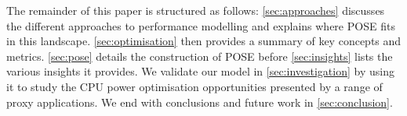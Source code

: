 The remainder of this paper is structured as follows: \autoref{sec:approaches} discusses the different approaches to performance modelling and explains where POSE fits in this landscape.
\autoref{sec:optimisation} then provides a summary of key concepts and metrics.
\autoref{sec:pose} details the construction of POSE before \autoref{sec:insights} lists the various insights it provides.
We validate our model in \autoref{sec:investigation} by using it to study the CPU power optimisation opportunities presented by a range of proxy applications. 
We end with conclusions and future work in \autoref{sec:conclusion}.
